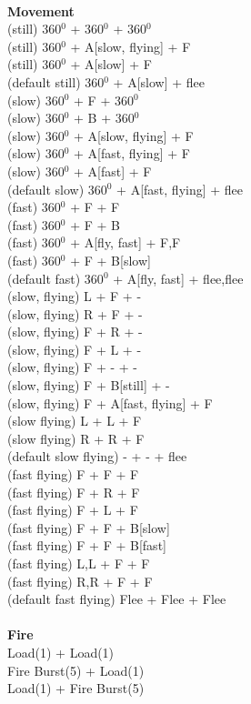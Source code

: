\ \\ {\bf Movement } \\
(still) 360$^0$ + 360$^0$ + 360$^0$ \\
(still) 360$^0$ + A[slow, flying] + F \\
(still) 360$^0$ + A[slow] + F \\
(default still) 360$^0$ + A[slow] + flee \\
(slow) 360$^0$ + F + 360$^0$ \\
(slow) 360$^0$ + B + 360$^0$ \\
(slow) 360$^0$ + A[slow, flying] + F \\
(slow) 360$^0$ + A[fast, flying] + F \\
(slow) 360$^0$ + A[fast] + F \\
(default slow) 360$^0$ + A[fast, flying] + flee \\
(fast) 360$^0$ + F + F \\
(fast) 360$^0$ + F + B \\
(fast) 360$^0$ + A[fly, fast] + F,F \\
(fast) 360$^0$ + F + B[slow] \\
(default fast) 360$^0$ + A[fly, fast] + flee,flee \\
(slow, flying) L + F + - \\
(slow, flying) R + F + - \\
(slow, flying) F + R + - \\
(slow, flying) F + L + - \\
(slow, flying) F + - + - \\
(slow, flying) F + B[still] + - \\
(slow, flying) F + A[fast, flying] + F \\
(slow flying) L + L + F \\
(slow flying) R + R + F \\
(default slow flying) - + - + flee \\
(fast flying) F + F + F \\
(fast flying) F + R + F \\
(fast flying) F + L + F \\
(fast flying) F + F + B[slow] \\
(fast flying) F + F + B[fast] \\
(fast flying) L,L + F + F \\
(fast flying) R,R + F + F \\
(default fast flying) Flee + Flee + Flee \\
\ \\ {\bf Fire } \\
Load(1) + Load(1) \\
Fire Burst(5) + Load(1) \\
Load(1) + Fire Burst(5) \\



